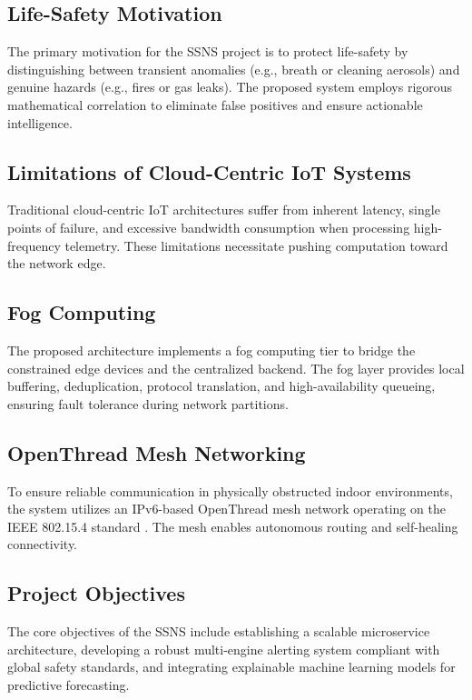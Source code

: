 \documentclass[conference]{IEEEtran}
\begin{document}
\subsection{Life-Safety Motivation}
The primary motivation for the SSNS project is to protect life-safety by distinguishing between transient anomalies (e.g., breath or cleaning aerosols) and genuine hazards (e.g., fires or gas leaks). The proposed system employs rigorous mathematical correlation to eliminate false positives and ensure actionable intelligence.

\subsection{Limitations of Cloud-Centric IoT Systems}
Traditional cloud-centric IoT architectures suffer from inherent latency, single points of failure, and excessive bandwidth consumption when processing high-frequency telemetry. These limitations necessitate pushing computation toward the network edge.

\subsection{Fog Computing}
The proposed architecture implements a fog computing tier to bridge the constrained edge devices and the centralized backend. The fog layer provides local buffering, deduplication, protocol translation, and high-availability queueing, ensuring fault tolerance during network partitions.

\subsection{OpenThread Mesh Networking}
\label{sec:intro-thread}
To ensure reliable communication in physically obstructed indoor environments, the system utilizes an IPv6-based OpenThread mesh network operating on the IEEE 802.15.4 standard \cite{b10}. The mesh enables autonomous routing and self-healing connectivity.

\subsection{Project Objectives}
The core objectives of the SSNS include establishing a scalable microservice architecture, developing a robust multi-engine alerting system compliant with global safety standards, and integrating explainable machine learning models for predictive forecasting.
\end{document}
